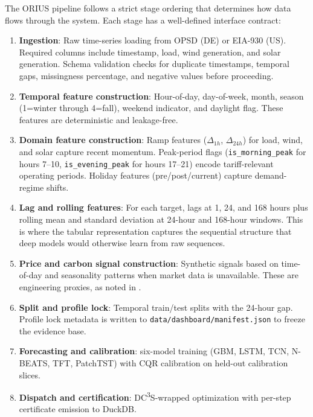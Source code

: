 \documentclass[11pt,a4paper]{article}
\begin{document}
The ORIUS pipeline follows a strict stage ordering that determines how data flows through the system. Each stage has a well-defined interface contract:

\begin{enumerate}[leftmargin=*,topsep=2pt,itemsep=1pt]
  \item \textbf{Ingestion}: Raw time-series loading from OPSD (DE) or EIA-930 (US). Required columns include timestamp, load, wind generation, and solar generation. Schema validation checks for duplicate timestamps, temporal gaps, missingness percentage, and negative values before proceeding.
  \item \textbf{Temporal feature construction}: Hour-of-day, day-of-week, month, season (1=winter through 4=fall), weekend indicator, and daylight flag. These features are deterministic and leakage-free.
  \item \textbf{Domain feature construction}: Ramp features ($\Delta_{1h}$, $\Delta_{24h}$) for load, wind, and solar capture recent momentum. Peak-period flags (\texttt{is\_morning\_peak} for hours 7--10, \texttt{is\_evening\_peak} for hours 17--21) encode tariff-relevant operating periods. Holiday features (pre/post/current) capture demand-regime shifts.
  \item \textbf{Lag and rolling features}: For each target, lags at 1, 24, and 168 hours plus rolling mean and standard deviation at 24-hour and 168-hour windows. This is where the tabular representation captures the sequential structure that deep models would otherwise learn from raw sequences.
  \item \textbf{Price and carbon signal construction}: Synthetic signals based on time-of-day and seasonality patterns when market data is unavailable. These are engineering proxies, as noted in .
  \item \textbf{Split and profile lock}: Temporal train/test splits with the 24-hour gap. Profile lock metadata is written to \texttt{data/dashboard/manifest.json} to freeze the evidence base.
  \item \textbf{Forecasting and calibration}: six-model training (GBM, LSTM, TCN, N-BEATS, TFT, PatchTST) with CQR calibration on held-out calibration slices.
  \item \textbf{Dispatch and certification}: DC\textsuperscript{3}S-wrapped optimization with per-step certificate emission to DuckDB.
\end{enumerate}
\end{document}
